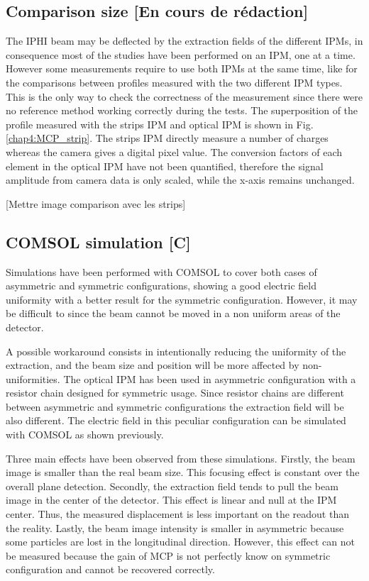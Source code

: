\begin{refsection}
  

  \subsection{Comparison size [En cours de rédaction]}
  The IPHI beam may be deflected by the extraction fields of the different IPMs, in consequence most of the studies have been performed on an IPM, one at a time. However some measurements require to use both IPMs at the same time, like for the comparisons between profiles measured with the two different IPM types. This is the only way to check the correctness of the measurement since there were no reference method working correctly during the tests.
  The superposition of the profile measured with the strips IPM and optical IPM is shown in Fig. \ref{chap4:MCP_strip}. The strips IPM directly measure a number of charges whereas the camera gives a digital pixel value. The conversion factors of each element in the optical IPM have not been quantified, therefore the signal amplitude from camera data is only scaled, while the x-axis remains unchanged.

  [Mettre image comparison avec les strips]
  

  \subsection{COMSOL simulation [C]}
  Simulations have been performed with COMSOL to cover both cases of asymmetric and symmetric configurations, showing  a good electric field uniformity with a  better result for the symmetric configuration. However, it may be difficult to since the beam cannot be moved in a non uniform areas of the detector.

  A possible workaround consists in intentionally reducing the uniformity of the extraction, and the beam size and position will be more affected by non-uniformities. The optical IPM has been used in asymmetric configuration with a resistor chain designed for symmetric usage. Since resistor chains are different between asymmetric and symmetric configurations the extraction field will be also different. The electric field in this peculiar configuration can be simulated with COMSOL as shown previously.

  Three main effects have been observed from these simulations. Firstly, the beam image is smaller than the real beam size. This focusing effect is constant over the overall plane detection. Secondly, the extraction field tends to pull the beam image in the center of the detector. This effect is linear and null at the IPM center. Thus, the measured displacement is less important on the readout than the reality. Lastly, the beam image intensity is smaller in asymmetric because some particles are lost in the longitudinal direction. However, this effect can not be measured because the gain of MCP is not perfectly know on symmetric configuration and cannot be recovered correctly.


\end{refsection}
